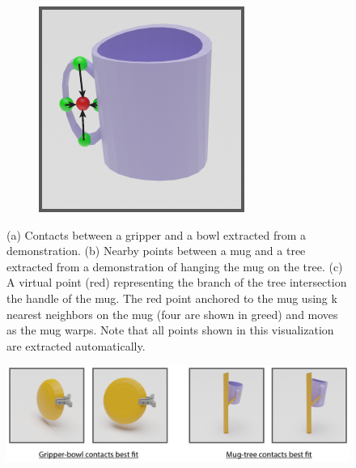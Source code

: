 \documentclass{article}
\begin{document}
\begin{figure}
\begin{subfigure}[b]{0.25\textwidth}
        \caption{}
    \end{subfigure}
    \hspace{0.05\textwidth}
    \begin{subfigure}[b]{0.25\textwidth}
        \centering
        \includegraphics[width=\textwidth]{figures/contact_fig2.pdf}
        \caption{}
    \end{subfigure}
    \caption{(a) Contacts between a gripper and a bowl extracted from a demonstration. (b) Nearby points between a mug and a tree extracted from a demonstration of hanging the mug on the tree. (c) A virtual point (red) representing the branch of the tree intersection the handle of the mug. The red point anchored to the mug using k nearest neighbors on the mug (four are shown in greed) and moves as the mug warps. Note that all points shown in this visualization are extracted automatically.}
    \label{fig:contacts}
\end{figure}

\begin{figure}
    \centering
    \includegraphics[width=\textwidth]{figures/picks_and_places.pdf}
    \caption{}
    \label{fig:latent}
\end{figure}
\end{document}
